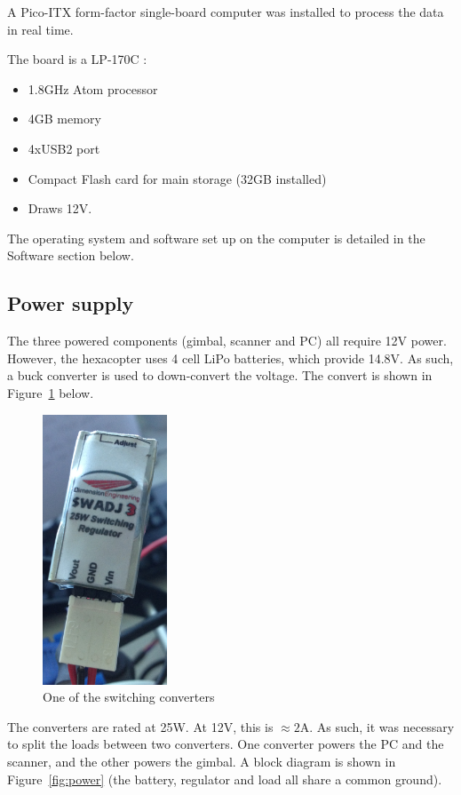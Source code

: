 \documentclass[12pt,oneside,a4paper]{book}
\begin{document}
A Pico-ITX form-factor single-board computer was installed to process
the data in real time. 

The board is a LP-170C \cite{pc}:
\begin{itemize}
\item 1.8GHz Atom processor
\item 4GB memory
\item 4xUSB2 port
\item Compact Flash card for main storage (32GB installed)
\item Draws 12V.
\end{itemize}

The operating system and software set up on the computer is detailed
in the Software section below. 

\subsection{Power supply}
\label{sec:power-supply-cons}

The three powered components (gimbal, scanner and PC) all require 12V
power. However, the hexacopter uses 4 cell LiPo batteries, which
provide 14.8V. As such, a buck converter is used to down-convert the
voltage. The convert is shown in
Figure~\ref{fig:converter} below.

\begin{figure}[h!]
  \centering
  \includegraphics[width=0.33\textwidth]{figs/converter}
  \caption{One of the switching converters}
  \label{fig:converter}
\end{figure}

The converters are rated at 25W. At 12V, this is $\approx 2$A. As
such, it was necessary to split the loads between two converters. One
converter powers the PC and the scanner, and the other powers the
gimbal. A block diagram is shown in Figure~\ref{fig:power} (the
battery, regulator and load all share a common ground).
\end{document}
